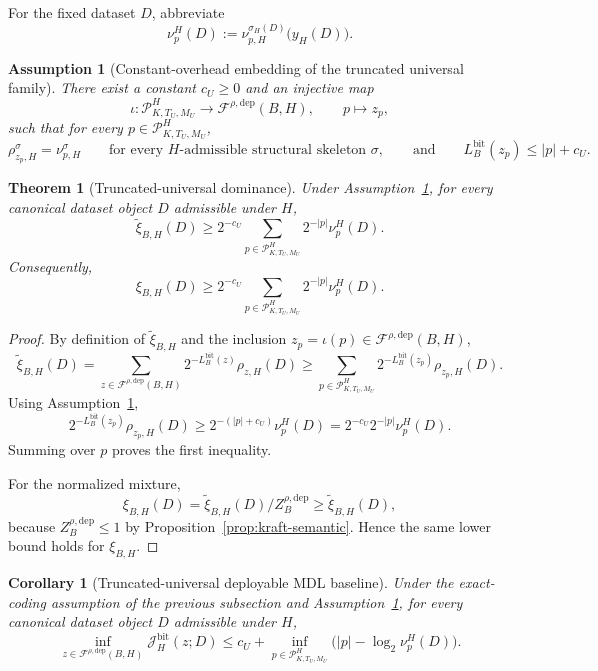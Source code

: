 \documentclass[11pt]{article}
\newtheorem{theorem}{Theorem}
\newtheorem{corollary}{Corollary}
\newtheorem{assumption}{Assumption}
\begin{document}
For the fixed dataset $D$, abbreviate
\[
\nu_p^H(D):=\nu_{p,H}^{\sigma_H(D)}\bigl(y_H(D)\bigr).
\]

\begin{assumption}[Constant-overhead embedding of the truncated universal family]
\label{ass:universal-embed}
There exist a constant $c_U\ge 0$ and an injective map
\[
\iota:\mathcal{P}_{K,T_U,M_U}^H
\to
\mathcal{F}^{\rho,\mathrm{dep}}(B,H),
\qquad
p\mapsto z_p,
\]
such that for every $p\in\mathcal{P}_{K,T_U,M_U}^H$,
\[
\rho_{z_p,H}^{\sigma}=\nu_{p,H}^{\sigma}
\qquad\text{for every $H$-admissible structural skeleton } \sigma,
\qquad\text{and}\qquad
L_B^{\mathrm{bit}}(z_p)\le |p|+c_U.
\]
\end{assumption}

\begin{theorem}[Truncated-universal dominance]
\label{thm:truncated-universal-dominance}
Under Assumption~\ref{ass:universal-embed}, for every canonical dataset object
$D$ admissible under $H$,
\[
\widetilde{\xi}_{B,H}(D)
\ge
2^{-c_U}
\sum_{p\in\mathcal{P}_{K,T_U,M_U}^H}
2^{-|p|}\nu_p^H(D).
\]
Consequently,
\[
\xi_{B,H}(D)
\ge
2^{-c_U}
\sum_{p\in\mathcal{P}_{K,T_U,M_U}^H}
2^{-|p|}\nu_p^H(D).
\]
\end{theorem}

\begin{proof}
By definition of $\widetilde{\xi}_{B,H}$ and the inclusion
$z_p=\iota(p)\in\mathcal{F}^{\rho,\mathrm{dep}}(B,H)$,
\[
\widetilde{\xi}_{B,H}(D)
=
\sum_{z\in\mathcal{F}^{\rho,\mathrm{dep}}(B,H)}
2^{-L_B^{\mathrm{bit}}(z)}\rho_{z,H}(D)
\ge
\sum_{p\in\mathcal{P}_{K,T_U,M_U}^H}
2^{-L_B^{\mathrm{bit}}(z_p)}\rho_{z_p,H}(D).
\]
Using Assumption~\ref{ass:universal-embed},
\[
2^{-L_B^{\mathrm{bit}}(z_p)}\rho_{z_p,H}(D)
\ge
2^{-(|p|+c_U)}\nu_p^H(D)
=
2^{-c_U}2^{-|p|}\nu_p^H(D).
\]
Summing over $p$ proves the first inequality.

For the normalized mixture,
\[
\xi_{B,H}(D)=\widetilde{\xi}_{B,H}(D)/Z_B^{\rho,\mathrm{dep}}
\ge \widetilde{\xi}_{B,H}(D),
\]
because $Z_B^{\rho,\mathrm{dep}}\le 1$ by
Proposition~\ref{prop:kraft-semantic}. Hence the same lower bound holds for
$\xi_{B,H}$.
\end{proof}

\begin{corollary}[Truncated-universal deployable MDL baseline]
\label{cor:truncated-universal-baseline}
Under the exact-coding assumption of the previous subsection and
Assumption~\ref{ass:universal-embed}, for every canonical dataset object $D$
admissible under $H$,
\[
\inf_{z\in\mathcal{F}^{\rho,\mathrm{dep}}(B,H)}\mathcal{J}_H^{\mathrm{bit}}(z;D)
\le
c_U
+
\inf_{p\in\mathcal{P}_{K,T_U,M_U}^H}
\bigl(|p|-\log_2 \nu_p^H(D)\bigr).
\]
\end{corollary}
\end{document}
